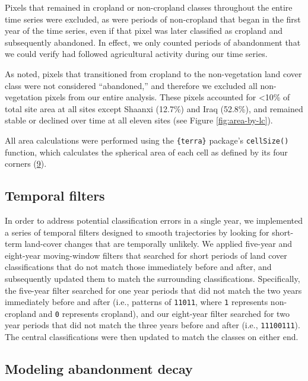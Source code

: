 \documentclass[9pt,lineno]{pnas-new}
\begin{document}
Pixels that remained in cropland or non-cropland classes throughout the entire time series were excluded, as were periods of non-cropland that began in the first year of the time series, even if that pixel was later classified as cropland and subsequently abandoned.
In effect, we only counted periods of abandonment that we could verify had followed agricultural activity during our time series.

As noted, pixels that transitioned from cropland to the non-vegetation land cover class were not considered ``abandoned,'' and therefore we excluded all non-vegetation pixels from our entire analysis.
These pixels accounted for \textless10\% of total site area at all sites except Shaanxi (12.7\%) and Iraq (52.8\%), and remained stable or declined over time at all eleven sites (see Figure \ref{fig:area-by-lc}).

All area calculations were performed using the \texttt{\{terra\}} package's \texttt{cellSize()} function, which calculates the spherical area of each cell as defined by its four corners (\protect\hyperlink{ref-R-terra}{9}).

\hypertarget{temporal-filters}{%
\subsection{Temporal filters}\label{temporal-filters}}

In order to address potential classification errors in a single year, we implemented a series of temporal filters designed to smooth trajectories by looking for short-term land-cover changes that are temporally unlikely.
We applied five-year and eight-year moving-window filters that searched for short periods of land cover classifications that do not match those immediately before and after, and subsequently updated them to match the surrounding classifications.
Specifically, the five-year filter searched for one year periods that did not match the two years immediately before and after (i.e., patterns of \texttt{11011}, where \texttt{1} represents non-cropland and \texttt{0} represents cropland), and our eight-year filter searched for two year periods that did not match the three years before and after (i.e., \texttt{11100111}).
The central classifications were then updated to match the classes on either end.

\hypertarget{decay-models-si}{%
\subsection{Modeling abandonment decay}\label{decay-models-si}}
\end{document}
